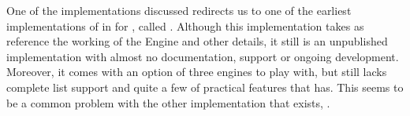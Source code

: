 \documentclass[thesis-solanki.tex]{subfiles}
\begin{document}
One of the implementations discussed redirects us to one of the earliest implementations of  in
 for , called  
\cite{website:mini-prolog-hugs98}.
Although this implementation takes as reference the working of the  Engine
and other details, it still is an unpublished implementation with almost no documentation, support  or ongoing
development.
Moreover, it comes with an option of three engines to play
with, but still lacks complete list support
and quite a few of practical features that  has.
This seems to be a common problem with the other implementation that exists, \cite{website:takashi-workplace}.
\end{document}
